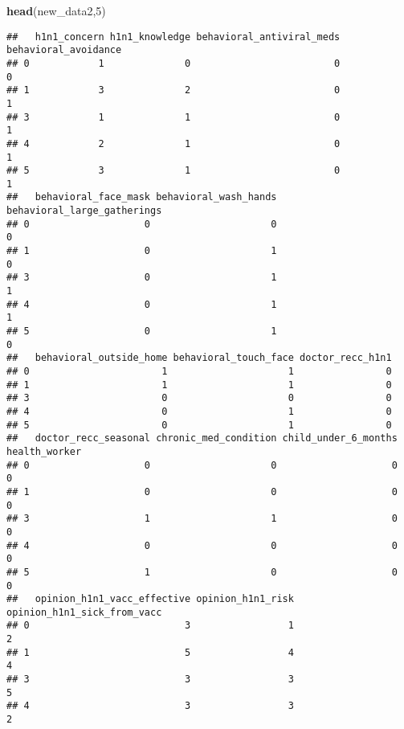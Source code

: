 \documentclass[
]{article}
\newenvironment{Shaded}{\begin{snugshade}}{\end{snugshade}}
\newcommand{\DecValTok}[1]{\textcolor[rgb]{0.00,0.00,0.81}{#1}}
\newcommand{\FunctionTok}[1]{\textcolor[rgb]{0.13,0.29,0.53}{\textbf{#1}}}
\newcommand{\NormalTok}[1]{#1}
\begin{document}
\begin{Shaded}
\begin{Highlighting}[]
\FunctionTok{head}\NormalTok{(new\_data2,}\DecValTok{5}\NormalTok{)}
\end{Highlighting}
\end{Shaded}

\begin{verbatim}
##   h1n1_concern h1n1_knowledge behavioral_antiviral_meds behavioral_avoidance
## 0            1              0                         0                    0
## 1            3              2                         0                    1
## 3            1              1                         0                    1
## 4            2              1                         0                    1
## 5            3              1                         0                    1
##   behavioral_face_mask behavioral_wash_hands behavioral_large_gatherings
## 0                    0                     0                           0
## 1                    0                     1                           0
## 3                    0                     1                           1
## 4                    0                     1                           1
## 5                    0                     1                           0
##   behavioral_outside_home behavioral_touch_face doctor_recc_h1n1
## 0                       1                     1                0
## 1                       1                     1                0
## 3                       0                     0                0
## 4                       0                     1                0
## 5                       0                     1                0
##   doctor_recc_seasonal chronic_med_condition child_under_6_months health_worker
## 0                    0                     0                    0             0
## 1                    0                     0                    0             0
## 3                    1                     1                    0             0
## 4                    0                     0                    0             0
## 5                    1                     0                    0             0
##   opinion_h1n1_vacc_effective opinion_h1n1_risk opinion_h1n1_sick_from_vacc
## 0                           3                 1                           2
## 1                           5                 4                           4
## 3                           3                 3                           5
## 4                           3                 3                           2

\end{verbatim}
\end{document}

